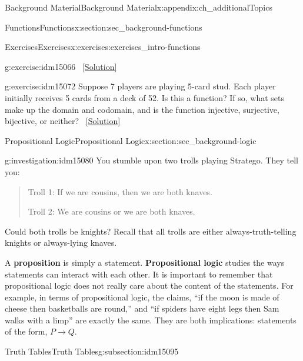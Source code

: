 \documentclass[oneside,10pt,]{book}
\newcommand{\terminology}[1]{\textbf{#1}}
\numberwithin{equation}{chapter}
\def\imp{\rightarrow}
\begin{document}
\begin{appendixptx}{Background Material}{}{Background Material}{}{}{x:appendix:ch_additionalTopics}
\begin{sectionptx}{Functions}{}{Functions}{}{}{x:section:sec_background-functions}
\begin{exercises-subsection}{Exercises}{}{Exercises}{}{}{x:exercises:exercises_intro-functions}
\begin{divisionexercise}{16}{}{}{g:exercise:idm15066}
\qquad~\hfill{\tiny\hyperlink{g:solution:idm15070-main}{[Solution]}}\end{divisionexercise}%
\begin{divisionexercise}{17}{}{}{g:exercise:idm15072}%
Suppose 7 players are playing 5-card stud. Each player initially receives 5 cards from a deck of 52. Is this a function? If so, what sets make up the domain and codomain, and is the function injective, surjective, bijective, or neither?%
\qquad~\hfill{\tiny\hyperlink{g:solution:idm15075-main}{[Solution]}}\end{divisionexercise}%
\end{exercises-subsection}
\end{sectionptx}
%
%
\typeout{************************************************}
\typeout{************************************************}
%
\begin{sectionptx}{Propositional Logic}{}{Propositional Logic}{}{}{x:section:sec_background-logic}
\begin{introduction}{}%
\begin{investigation}{}{g:investigation:idm15080}%
You stumble upon two trolls playing Stratego\textregistered{}.  They tell you:%
\begin{quote}%
Troll 1: If we are cousins, then we are both knaves.%
\par
Troll 2: We are cousins or we are both knaves.%
\end{quote}
Could both trolls be knights?  Recall that all trolls are either always-truth-telling knights or always-lying knaves.%
\end{investigation}
A \terminology{proposition} is simply a statement. \terminology{Propositional logic} studies the ways statements can interact with each other. It is important to remember that propositional logic does not really care about the content of the statements. For example, in terms of propositional logic, the claims, ``if the moon is made of cheese then basketballs are round,'' and ``if spiders have eight legs then Sam walks with a limp'' are exactly the same. They are both implications: statements of the form, \(P \imp Q\).%
\end{introduction}%
%
%
\typeout{************************************************}
\typeout{************************************************}
%
\begin{subsectionptx}{Truth Tables}{}{Truth Tables}{}{}{g:subsection:idm15095}
%

\end{subsectionptx}
\end{sectionptx}
\end{appendixptx}
\end{document}
